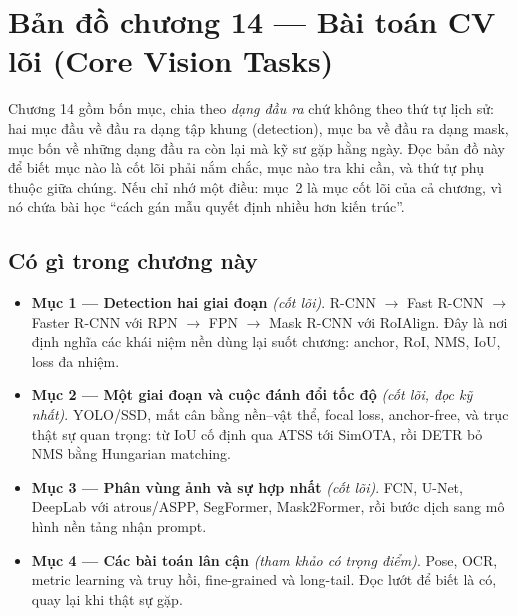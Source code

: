\documentclass[../../deep_learning.tex]{subfiles}
\begin{document}
\section*{Bản đồ chương 14 --- Bài toán CV lõi (Core Vision Tasks)}

\begin{tomtat}
Chương 14 gồm bốn mục, chia theo \emph{dạng đầu ra} chứ không theo thứ tự lịch sử: hai mục đầu về đầu ra dạng tập khung (detection), mục ba về đầu ra dạng mask, mục bốn về những dạng đầu ra còn lại mà kỹ sư gặp hằng ngày. Đọc bản đồ này để biết mục nào là cốt lõi phải nắm chắc, mục nào tra khi cần, và thứ tự phụ thuộc giữa chúng. Nếu chỉ nhớ một điều: mục~2 là mục cốt lõi của cả chương, vì nó chứa bài học ``cách gán mẫu quyết định nhiều hơn kiến trúc''.
\end{tomtat}

\begin{nentang}
\end{nentang}

\subsection*{Có gì trong chương này}

\begin{itemize}
\item \textbf{Mục 1 --- Detection hai giai đoạn} \emph{(cốt lõi)}. R-CNN \(\rightarrow\) Fast R-CNN \(\rightarrow\) Faster R-CNN với RPN \(\rightarrow\) FPN \(\rightarrow\) Mask R-CNN với RoIAlign. Đây là nơi định nghĩa các khái niệm nền dùng lại suốt chương: anchor, RoI, NMS, IoU, loss đa nhiệm.
\item \textbf{Mục 2 --- Một giai đoạn và cuộc đánh đổi tốc độ} \emph{(cốt lõi, đọc kỹ nhất)}. YOLO/SSD, mất cân bằng nền--vật thể, focal loss, anchor-free, và trục thật sự quan trọng:  từ IoU cố định qua ATSS tới SimOTA, rồi DETR bỏ NMS bằng Hungarian matching.
\item \textbf{Mục 3 --- Phân vùng ảnh và sự hợp nhất} \emph{(cốt lõi)}. FCN, U-Net, DeepLab với atrous/ASPP, SegFormer, Mask2Former, rồi bước dịch sang mô hình nền tảng nhận prompt.
\item \textbf{Mục 4 --- Các bài toán lân cận} \emph{(tham khảo có trọng điểm)}. Pose, OCR, metric learning và truy hồi, fine-grained và long-tail. Đọc lướt để biết là có, quay lại khi thật sự gặp.
\end{itemize}
\end{document}
